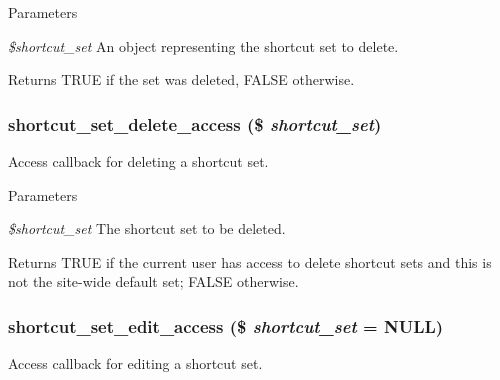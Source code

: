 \begin{DoxyParams}{Parameters}
\item[{\em \$shortcut\_\-set}]An object representing the shortcut set to delete.\end{DoxyParams}
\begin{DoxyReturn}{Returns}
TRUE if the set was deleted, FALSE otherwise. 
\end{DoxyReturn}
\hypertarget{shortcut_8module_a2450476e0aea6c92238956d5b487e90d}{
\subsubsection[{shortcut\_\-set\_\-delete\_\-access}]{\setlength{\rightskip}{0pt plus 5cm}shortcut\_\-set\_\-delete\_\-access (\$ {\em shortcut\_\-set})}}
\label{shortcut_8module_a2450476e0aea6c92238956d5b487e90d}
Access callback for deleting a shortcut set.


\begin{DoxyParams}{Parameters}
\item[{\em \$shortcut\_\-set}]The shortcut set to be deleted.\end{DoxyParams}
\begin{DoxyReturn}{Returns}
TRUE if the current user has access to delete shortcut sets and this is not the site-\/wide default set; FALSE otherwise. 
\end{DoxyReturn}
\hypertarget{shortcut_8module_aecd2c157d66aa54154e65f25febbf619}{
\subsubsection[{shortcut\_\-set\_\-edit\_\-access}]{\setlength{\rightskip}{0pt plus 5cm}shortcut\_\-set\_\-edit\_\-access (\$ {\em shortcut\_\-set} = {\ttfamily NULL})}}
\label{shortcut_8module_aecd2c157d66aa54154e65f25febbf619}
Access callback for editing a shortcut set.


